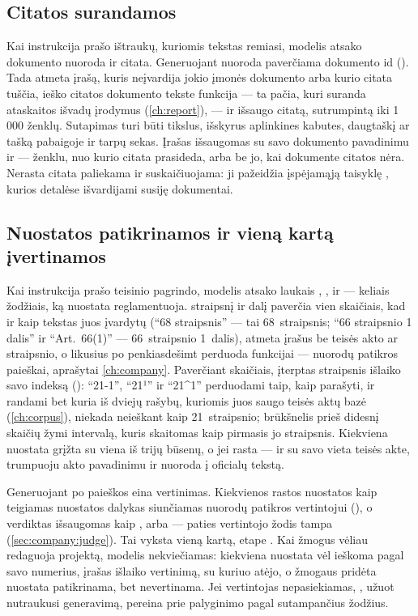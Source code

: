 \subsection{Citatos surandamos}

Kai instrukcija prašo ištraukų, kuriomis tekstas remiasi, modelis atsako dokumento nuoroda ir
citata. Generuojant nuoroda paverčiama dokumento id (). Tada
 atmeta įrašą, kuris neįvardija jokio įmonės dokumento arba kurio citata
tuščia, ieško citatos dokumento tekste funkcija  --- ta pačia, kuri suranda
ataskaitos išvadų įrodymus (\cref{ch:report}), --- ir išsaugo citatą, sutrumpintą iki 1\,000
ženklų. Sutapimas turi būti tikslus, išskyrus aplinkines kabutes, daugtaškį ar tašką pabaigoje
ir tarpų sekas. Įrašas išsaugomas su savo dokumento pavadinimu ir  --- ženklu, nuo
kurio citata prasideda, arba be jo, kai dokumente citatos nėra. Nerasta citata paliekama ir
suskaičiuojama: ji pažeidžia įspėjamąją taisyklę , kurios detalėse išvardijami
susiję dokumentai.

\subsection{Nuostatos patikrinamos ir vieną kartą įvertinamos}

Kai instrukcija prašo teisinio pagrindo, modelis atsako laukais , ,
 ir  --- keliais žodžiais, ką nuostata reglamentuoja.
 straipsnį ir dalį paverčia vien skaičiais, kad ir kaip tekstas juos
įvardytų (\enquote{68 straipsnis} --- tai 68~straipsnis; \enquote{66 straipsnio 1 dalis} ir
\enquote{Art.~66(1)} --- 66~straipsnio 1~dalis), atmeta įrašus be teisės akto ar straipsnio, o
likusius po penkiasdešimt perduoda funkcijai  --- nuorodų patikros
paieškai, aprašytai \cref{ch:company}. Paverčiant skaičiais, įterptas straipsnis išlaiko savo
indeksą (): \enquote{21-1}, \enquote{21¹} ir \enquote{21\textasciicircum 1}
perduodami taip, kaip parašyti, ir randami bet kuria iš dviejų rašybų, kuriomis juos saugo
teisės aktų bazė (\cref{ch:corpus}), niekada neieškant kaip 21~straipsnio; brūkšnelis prieš
didesnį skaičių žymi intervalą, kuris skaitomas kaip pirmasis jo straipsnis. Kiekviena nuostata grįžta su viena iš trijų būsenų, o
jei rasta --- ir su savo vieta teisės akte, trumpuoju akto pavadinimu ir nuoroda į oficialų
tekstą.

Generuojant po paieškos eina vertinimas. Kiekvienos rastos nuostatos  kaip
teigiamas nuostatos dalykas siunčiamas nuorodų patikros vertintojui
(), o verdiktas išsaugomas kaip , 
arba  --- paties vertintojo žodis  tampa 
(\cref{sec:company:judge}). Tai vyksta vieną kartą, etape . Kai žmogus vėliau redaguoja
projektą, modelis nekviečiamas: kiekviena nuostata vėl ieškoma pagal savo numerius, įrašas
išlaiko vertinimą, su kuriuo atėjo, o žmogaus pridėta nuostata patikrinama, bet nevertinama.
Jei vertintojas nepasiekiamas, , užuot nutraukusi generavimą, pereina prie
palyginimo pagal sutampančius žodžius.

